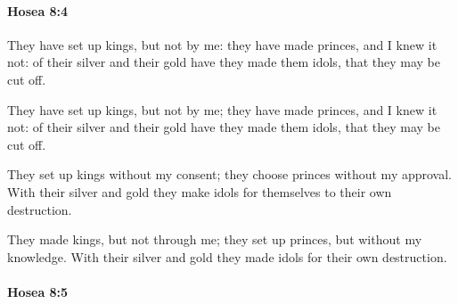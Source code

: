 		\paragraph{Hosea 8:4} %
			\label{HOSEA-8-4}

			They have set up kings, but not by me: they have made princes, and I knew it not: of their silver and their gold have they made them idols, that they may be cut off.

			\begin{versebox}
					\item[BHS] 
					\item[LXX] 
					\item[ASV] They have set up kings, but not by me; they have made princes, and I knew it not: of their silver and their gold have they made them idols, that they may be cut off.
					\item[NIV] They set up kings without my consent; they choose princes without my approval. With their silver and gold they make idols for themselves to their own destruction.
					\item[NRSV] They made kings, but not through me; they set up princes, but without my knowledge. With their silver and gold they made idols for their own destruction.
			\end{versebox}

		\paragraph{Hosea 8:5} %
			\label{HOSEA-8-5}

